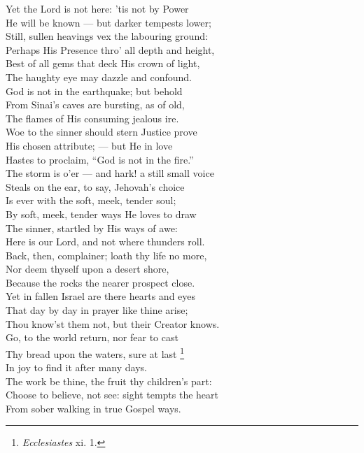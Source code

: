   Yet the Lord is not here: ’tis not by Power \\
 He will be known — but darker tempests lower; \\
 Still, sullen heavings vex the labouring ground: \\
 Perhaps His Presence thro’ all depth and height, \\
 Best of all gems that deck His crown of light, \\
 The haughty eye may dazzle and confound. \\
  God is not in the earthquake; but behold \\
 From Sinai’s caves are bursting, as of old, \\
 The flames of His consuming jealous ire. \\
 Woe to the sinner should stern Justice prove \\
 His chosen attribute; — but He in love \\
 Hastes to proclaim, “God is not in the fire.” \\
  The storm is o’er — and hark! a still small voice \\
 Steals on the ear, to say, Jehovah’s choice \\
 Is ever with the soft, meek, tender soul; \\
 By soft, meek, tender ways He loves to draw \\
 The sinner, startled by His ways of awe: \\
 Here is our Lord, and not where thunders roll. \\
  Back, then, complainer; loath thy life no more, \\
 Nor deem thyself upon a desert shore, \\
 Because the rocks the nearer prospect close. \\
 Yet in fallen Israel are there hearts and eyes \\
 That day by day in prayer like thine arise; \\
 Thou know’st them not, but their Creator knows. \\
  Go, to the world return, nor fear to cast \\
 Thy bread upon the waters, sure at last \footnote{\emph{Ecclesiastes} xi. 1.}\\
 In joy to find it after many days. \\
 The work be thine, the fruit thy children’s part: \\
 Choose to believe, not see: sight tempts the heart \\
 From sober walking in true Gospel ways.\\

